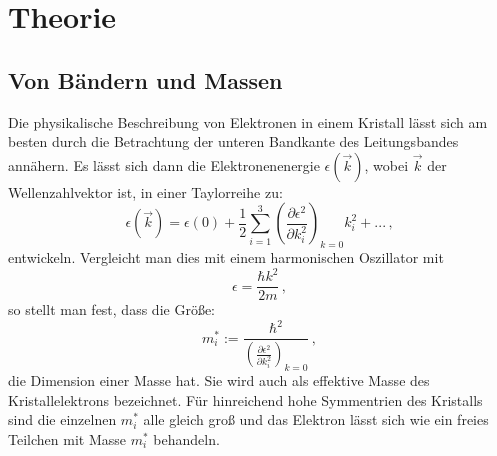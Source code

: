 \section{Theorie}
\subsection{Von Bändern und Massen}%
Die physikalische Beschreibung von Elektronen in einem Kristall lässt sich am besten durch die Betrachtung der unteren Bandkante des Leitungsbandes annähern. Es lässt sich dann die Elektronenenergie $\epsilon(\vec{k})$, wobei $\vec{k}$ der Wellenzahlvektor ist, in einer Taylorreihe zu:
\begin{equation}
\epsilon(\vec{k})=\epsilon\left(0\right)+\frac{1}{2}\sum_{i=1}^3\left(\frac{\partial\epsilon^2}{\partial k_i^2}\right)_{k=0}k_i^2+...\,,
\end{equation}
entwickeln.
Vergleicht man dies mit einem harmonischen Oszillator mit
\begin{equation}
  \epsilon=\frac{\hbar k^2}{2m}\,,
\end{equation}
so stellt man fest, dass die Größe:
\begin{equation}
m_i^*:=\frac{\hbar^2}{\left(\frac{\partial\epsilon^2}{\partial k_i^2}\right)_{k=0}}\,,
\end{equation}
die Dimension einer Masse hat. Sie wird auch als effektive Masse des Kristallelektrons bezeichnet.
Für hinreichend hohe Symmentrien des Kristalls sind die einzelnen $m_i^*$ alle gleich groß und das Elektron lässt sich wie ein freies Teilchen mit Masse $m_i^*$ behandeln.
